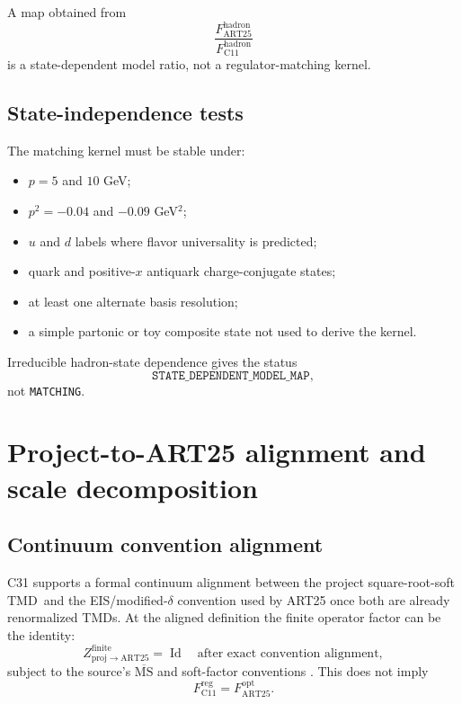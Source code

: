 \documentclass[11pt]{article}
\newcommand{\Id}{\operatorname{Id}}
\newcommand{\TMD}{\ensuremath{\mathrm{TMD}}}
\newcommand{\Proj}{\ensuremath{\mathrm{proj}}}
\newcommand{\ART}{\ensuremath{\mathrm{ART25}}}
\begin{document}
A map obtained from
\begin{equation}
 \frac{F_{\ART}^{\mathrm{hadron}}}{F_{\mathrm{C11}}^{\mathrm{hadron}}}
 \label{eq:forbidden-ratio}
\end{equation}
is a state-dependent model ratio, not a regulator-matching kernel.

\subsection{State-independence tests}

The matching kernel must be stable under:
\begin{itemize}
\item \(p=5\) and \(10\) GeV;
\item \(p^2=-0.04\) and \(-0.09\) GeV\(^2\);
\item \(u\) and \(d\) labels where flavor universality is predicted;
\item quark and positive-\(x\) antiquark charge-conjugate states;
\item at least one alternate basis resolution;
\item a simple partonic or toy composite state not used to derive the kernel.
\end{itemize}
Irreducible hadron-state dependence gives the status
\begin{equation}
 \texttt{STATE\_DEPENDENT\_MODEL\_MAP},
 \label{eq:state-dependent-map}
\end{equation}
not \texttt{MATCHING}.

\section{Project-to-ART25 alignment and scale decomposition}
\label{sec:art25-alignment}

\subsection{Continuum convention alignment}

C31 supports a formal continuum alignment between the project square-root-soft \TMD\ and the EIS/modified-\(\delta\) convention used by ART25 once both are already renormalized TMDs.  At the aligned definition the finite operator factor can be the identity:
\begin{equation}
 Z_{\Proj\to\ART}^{\mathrm{finite}}
 =
 \Id
 \quad\text{after exact convention alignment},
 \label{eq:formal-identity}
\end{equation}
subject to the source's \(\overline{\mathrm{MS}}\) and soft-factor conventions \cite{CollinsRogers2012}.  This does not imply
\begin{equation}
 F_{\mathrm{C11}}^{\mathrm{reg}}
 =
 F_{\ART}^{\mathrm{opt}}.
 \label{eq:not-direct}
\end{equation}
\end{document}
